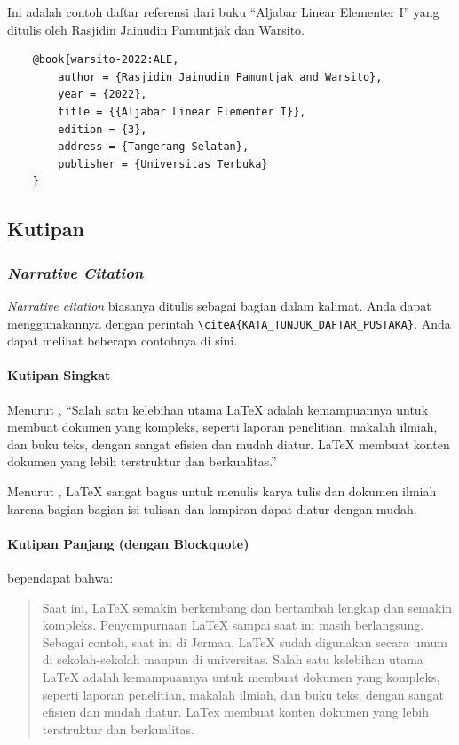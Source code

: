 Ini adalah contoh daftar referensi dari buku ``Aljabar Linear Elementer I'' yang ditulis oleh Rasjidin Jainudin Pamuntjak dan Warsito.

\begin{lstlisting}
    @book{warsito-2022:ALE,
        author = {Rasjidin Jainudin Pamuntjak and Warsito},
        year = {2022},
        title = {{Aljabar Linear Elementer I}},
        edition = {3},
        address = {Tangerang Selatan},
        publisher = {Universitas Terbuka}
    }
\end{lstlisting}

\subsection{Kutipan}

\subsubsection{\textit{Narrative Citation}}

\textit{Narrative citation} biasanya ditulis sebagai bagian dalam kalimat. Anda dapat menggunakannya dengan perintah \verb|\citeA{KATA_TUNJUK_DAFTAR_PUSTAKA}|. Anda dapat melihat beberapa contohnya di sini.

\paragraph{Kutipan Singkat}

Menurut , ``Salah satu kelebihan utama LaTeX adalah kemampuannya untuk membuat dokumen yang kompleks, seperti laporan penelitian, makalah ilmiah, dan buku teks, dengan sangat efisien dan mudah diatur. LaTeX membuat konten dokumen yang lebih terstruktur dan berkualitas.''

Menurut , LaTeX sangat bagus untuk menulis karya tulis dan dokumen ilmiah karena bagian-bagian isi tulisan dan lampiran dapat diatur dengan mudah.

\paragraph{Kutipan Panjang (dengan Blockquote)}

 bependapat bahwa:

\begin{quote}
    Saat ini, LaTeX semakin berkembang dan bertambah lengkap dan semakin kompleks. Penyempurnaan LaTeX sampai saat ini masih berlangsung. Sebagai contoh, saat ini di Jerman, LaTeX sudah digunakan secara umum di sekolah-sekolah maupun di universitas. Salah satu kelebihan utama LaTeX adalah kemampuannya untuk membuat dokumen yang kompleks, seperti laporan penelitian, makalah ilmiah, dan buku teks, dengan sangat efisien dan mudah diatur. LaTex membuat konten dokumen yang lebih terstruktur dan berkualitas.
\end{quote}

